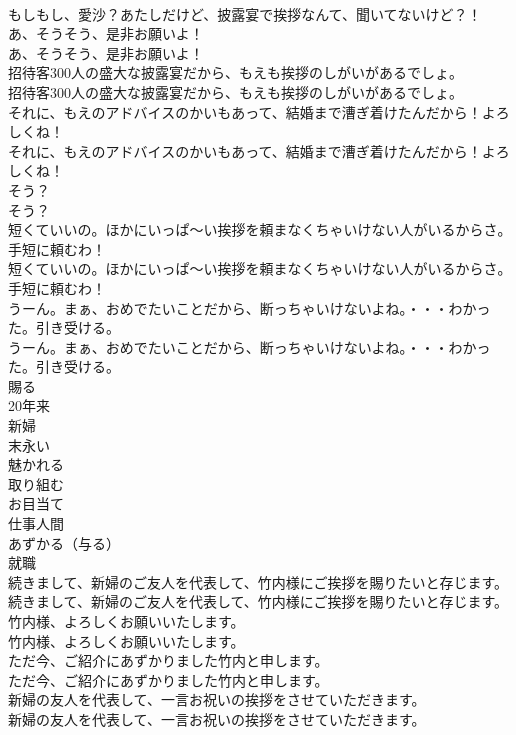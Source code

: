 \documentclass[8pt]{extreport}
\begin{document}
\begin{CJK}{UTF8}{min}
\\	もしもし、愛沙？あたしだけど、披露宴で挨拶なんて、聞いてないけど？！ 
\\	あ、そうそう、是非お願いよ！	
\\	あ、そうそう、是非お願いよ！ 
\\	招待客300人の盛大な披露宴だから、もえも挨拶のしがいがあるでしょ。	
\\	招待客300人の盛大な披露宴だから、もえも挨拶のしがいがあるでしょ。 
\\	それに、もえのアドバイスのかいもあって、結婚まで漕ぎ着けたんだから！よろしくね！	
\\	それに、もえのアドバイスのかいもあって、結婚まで漕ぎ着けたんだから！よろしくね！ 
\\	そう？	
\\	そう？ 
\\	短くていいの。ほかにいっぱ～い挨拶を頼まなくちゃいけない人がいるからさ。手短に頼むわ！	
\\	短くていいの。ほかにいっぱ～い挨拶を頼まなくちゃいけない人がいるからさ。手短に頼むわ！ 
\\	うーん。まぁ、おめでたいことだから、断っちゃいけないよね。・・・わかった。引き受ける。	
\\	うーん。まぁ、おめでたいことだから、断っちゃいけないよね。・・・わかった。引き受ける。 
\\	賜る
\\	20年来
\\	新婦
\\	末永い
\\	魅かれる
\\	取り組む
\\	お目当て
\\	仕事人間
\\	あずかる（与る）
\\	就職
\\	続きまして、新婦のご友人を代表して、竹内様にご挨拶を賜りたいと存じます。	
\\	続きまして、新婦のご友人を代表して、竹内様にご挨拶を賜りたいと存じます。 
\\	竹内様、よろしくお願いいたします。	
\\	竹内様、よろしくお願いいたします。 
\\	ただ今、ご紹介にあずかりました竹内と申します。	
\\	ただ今、ご紹介にあずかりました竹内と申します。 
\\	新婦の友人を代表して、一言お祝いの挨拶をさせていただきます。	
\\	新婦の友人を代表して、一言お祝いの挨拶をさせていただきます。 

\end{CJK}
\end{document}
